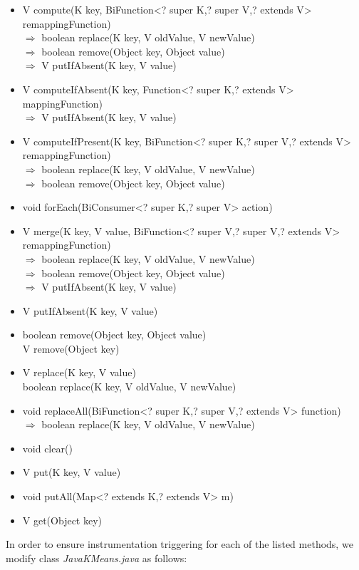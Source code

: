 \documentclass[]{usiinfthesis}
\begin{document}
\begin{itemize}
    \item   V compute(K key, BiFunction<? super K,? super V,? extends V> remappingFunction)
    \mbox{}\\ $\Rightarrow$   boolean replace(K key, V oldValue, V newValue)
    \mbox{}\\ $\Rightarrow$   boolean remove(Object key, Object value)
    \mbox{}\\ $\Rightarrow$   V putIfAbsent(K key, V value)
    \item   V computeIfAbsent(K key, Function<? super K,? extends V> mappingFunction)
    \mbox{}\\ $\Rightarrow$   V putIfAbsent(K key, V value)
    \item   V computeIfPresent(K key, BiFunction<? super K,? super V,? extends V> remappingFunction)
    \mbox{}\\ $\Rightarrow$   boolean replace(K key, V oldValue, V newValue)
    \mbox{}\\ $\Rightarrow$   boolean remove(Object key, Object value)
    \item   void forEach(BiConsumer<? super K,? super V> action)
    \item   V merge(K key, V value, BiFunction<? super V,? super V,? extends V> remappingFunction)
    \mbox{}\\ $\Rightarrow$   boolean replace(K key, V oldValue, V newValue)
    \mbox{}\\ $\Rightarrow$   boolean remove(Object key, Object value)
    \mbox{}\\ $\Rightarrow$   V putIfAbsent(K key, V value)
    \item   V putIfAbsent(K key, V value)
    \item   boolean remove(Object key, Object value)
    \mbox{}\\      V remove(Object key)
    \item   V replace(K key, V value)
    \mbox{}\\      boolean replace(K key, V oldValue, V newValue)
    \item   void replaceAll(BiFunction<? super K,? super V,? extends V> function)
    \mbox{}\\ $\Rightarrow$   boolean replace(K key, V oldValue, V newValue)
    \item   void clear()
    \item   V put(K key, V value)
    \item   void putAll(Map<? extends K,? extends V> m)
    \item   V get(Object key)
\end{itemize}
In order to ensure instrumentation triggering for each of the listed methods, we modify class \textit{JavaKMeans.java} as follows:
\end{document}
